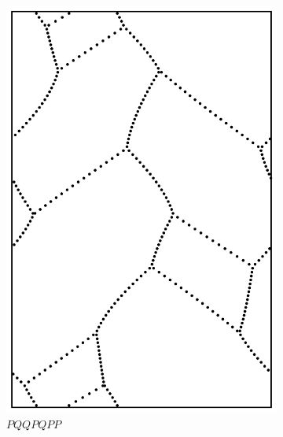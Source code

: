 \documentclass[12pt,twoside]{reedthesis}
\theoremstyle{definition}
\begin{document}
\begin{figure}[h]
\begin{subfigure}[t]{0.24\textwidth}
    \includegraphics[width=\textwidth]{figures/string_cheese_appendix/pqqpqpp.pdf}
    \caption*{$PQQPQPP$}
    \vspace{5mm}
  \end{subfigure}
  \begin{subfigure}[t]{0.24\textwidth}

\end{subfigure}
\end{figure}
\end{document}
